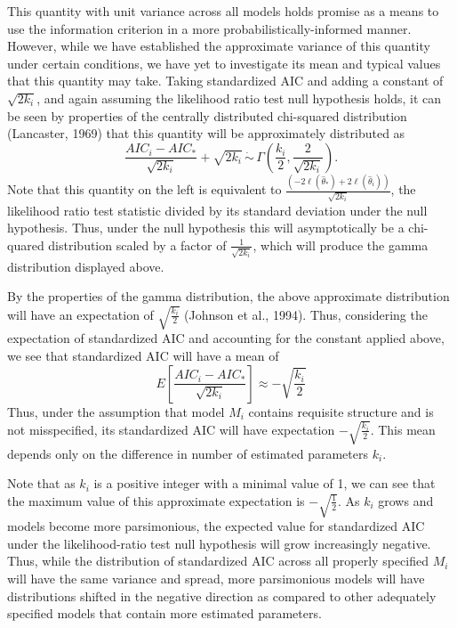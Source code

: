 		This quantity with unit variance across all models holds promise as a means to use the information criterion in a more probabilistically-informed manner. However, while we have established
		the approximate variance of this quantity under certain conditions, we have yet to investigate its mean and typical values that this quantity may take. Taking
		standardized AIC and adding a constant of $\sqrt{2 k_i}$, and again assuming the likelihood ratio test null hypothesis holds, it can be seen by properties of the centrally distributed
		chi-squared distribution (Lancaster, 1969) that this quantity will be approximately distributed as
		\begin{equation}
			\frac{AIC_i - AIC_*}{\sqrt{2k_i}} + \sqrt{2k_i} \, \dot\sim \, \Gamma \left( \frac{k_i}{2}, \frac{2}{\sqrt{2k_i}} \right) .
		\end{equation}
		Note that this quantity on the left is equivalent to $\frac{ \left( -2 \ell (\hat{\theta}_*) + 2 \ell (\hat{\theta}_i) \right) }{\sqrt{2k_i}}$, the likelihood ratio test statistic
		divided by its standard deviation under the null hypothesis. Thus, under the null hypothesis this will asymptotically be a chi-quared distribution scaled by a factor of $\frac{1}{\sqrt{2k_i}}$,
		which will produce the gamma distribution displayed above.

		By the properties of the gamma distribution, the above approximate distribution will have an expectation of $\sqrt{\frac{k_i}{2}}$ (Johnson et al., 1994). Thus, considering the expectation
		of standardized AIC and accounting for the constant applied above, we see that standardized AIC will have a mean of
		\begin{equation}
			E \left[ \frac{AIC_i - AIC_*}{\sqrt{2k_i}} \right] \approx -\sqrt{\frac{k_i}{2}}
		\end{equation}
		Thus, under the assumption that model $M_i$ contains requisite structure and is not misspecified, its standardized AIC will have expectation $-\sqrt{\frac{k_i}{2}}$. This mean depends only
		on the difference in number of estimated parameters $k_i$.

		Note that as $k_i$ is a positive integer with a minimal value of 1, we can see that the maximum value of this approximate expectation is $- \sqrt{\frac{1}{2}}$. As $k_i$ grows and models
		become more parsimonious, the expected value for standardized AIC under the likelihood-ratio test null hypothesis will grow increasingly negative. Thus, while the distribution of
		standardized AIC across all properly specified $M_i$ will have the same variance and spread, more parsimonious models will have distributions shifted in the negative direction as
		compared to other adequately specified models that contain more estimated parameters.

